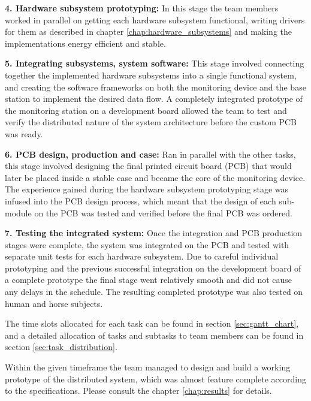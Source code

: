 \begin{description}
\item{\bfseries 4. Hardware subsystem prototyping:}
In this stage the team members worked in parallel on getting each hardware subsystem functional, writing drivers for them as described in chapter \ref{chap:hardware_subsystems} and making the implementations energy efficient and stable. 

\item{\bfseries 5. Integrating subsystems, system software:}
This stage involved connecting together the implemented hardware subsystems into a single functional system, and creating the 	software frameworks on both the monitoring device and the base station to implement the desired data flow. A completely integrated prototype of the monitoring station on a development board allowed the team to test and verify the distributed nature of the system architecture before the custom PCB was ready.

\item{\bfseries 6. PCB design, production and case:}
Ran in parallel with the other tasks, this stage involved designing the final printed circuit board (PCB) that would later be placed inside a stable case and became the core of the monitoring device. The experience gained during the hardware subsystem prototyping stage was infused into the PCB design process, which meant that the design of each sub-module on the PCB was tested and verified before the final PCB was ordered. 

\item{\bfseries 7. Testing the integrated system:}
Once the integration and PCB production stages were complete, the system was integrated on the PCB and tested with separate unit tests for each hardware subsystem.  Due to careful individual prototyping and the previous successful integration on the development board of a complete prototype the final stage went relatively smooth and did not cause any delays in the schedule. The resulting completed prototype was also tested on human and horse subjects.
\end{description}

The time slots allocated for each task can be found in section \ref{sec:gantt_chart}, and a detailed allocation of tasks and subtasks to team members can be found in section \ref{sec:task_distribution}.

Within the given timeframe the team managed to design and build a working prototype of the distributed system, which was almost feature complete according to the specifications. Please consult the chapter \ref{chap:results} for details.

